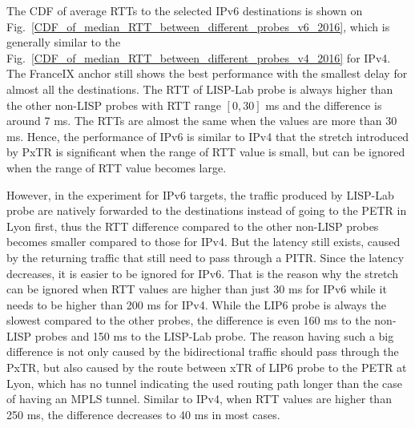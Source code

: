 The CDF of average RTTs to the selected IPv6 destinations is shown on Fig.~\ref{CDF_of_median_RTT_between_different_probes_v6_2016}, which is generally similar to the Fig.~\ref{CDF_of_median_RTT_between_different_probes_v4_2016} for IPv4. The FranceIX anchor still shows the best performance with the smallest delay for almost all the destinations. The RTT of LISP-Lab probe is always higher than the other non-LISP probes with RTT range $[0, 30]$ ms and the difference is around 7 ms. The RTTs are almost the same when the values are more than 30 ms. Hence, the performance of IPv6 is similar to IPv4 that the stretch introduced by PxTR is significant when the range of RTT value is small, but can be ignored when the range of RTT value becomes large. 

However, in the experiment for IPv6 targets, the traffic produced by LISP-Lab probe are natively forwarded to the destinations instead of going to the PETR in Lyon first, thus the RTT difference compared to the other non-LISP probes becomes smaller compared to those for IPv4. But the latency still exists, caused by the returning traffic that still need to pass through a PITR. Since the latency decreases, it is easier to be ignored for IPv6. That is the reason why the stretch can be ignored when RTT values are higher than just 30 ms for IPv6 while it needs to be higher than 200 ms for IPv4. While the LIP6 probe is always the slowest compared to the other probes, the difference is even 160 ms to the non-LISP probes and 150 ms to the LISP-Lab probe. The reason having such a big difference is not only caused by the bidirectional traffic should pass through the PxTR, but also caused by the route between xTR of LIP6 probe to the PETR at Lyon, which has no tunnel indicating the used routing path longer than the case of having an MPLS tunnel. Similar to IPv4, when RTT values are higher than 250 ms, the difference decreases to 40 ms in most cases.

